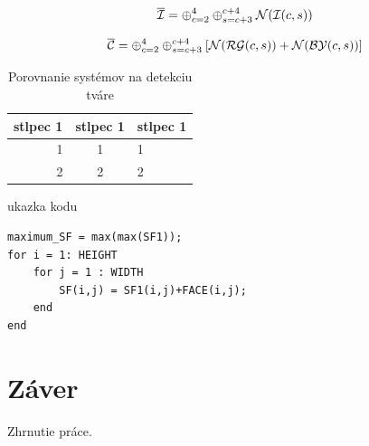\documentclass[12pt,oneside,a4paper]{book}
\begin{document}
\begin{equation}
     \overline{\cal{I}}  = \oplus _{c=2}^{4} \oplus _{s=c+3}^{c+4} \begin{cal}N\end{cal}(\begin{cal}I\end{cal}(c,s))
\end{equation}

\begin{equation}
    \overline{\begin{cal}C\end{cal}}  = \oplus _{c=2}^{4} \oplus _{s=c+3}^{c+4} [\begin{cal}N\end{cal}(\begin{cal}RG\end{cal}(c,s)) + \begin{cal}N\end{cal}(\begin{cal}BY\end{cal}(c,s))]
\end{equation}

\begin{table}[t]
  \centering
   \begin{tabular}{|r|c|l|}
     \hline
     stlpec 1&stlpec 1&stlpec 1\\
     \hline
     1& 1& 1\\
     2& 2& 2\\
     \hline
   \end{tabular}
   \caption{Porovnanie systémov na detekciu tváre}
  \label{tab:table1}
\end{table} 

\newpage
ukazka kodu
\begin{verbatim}
maximum_SF = max(max(SF1));
for i = 1: HEIGHT
    for j = 1 : WIDTH
   		SF(i,j) = SF1(i,j)+FACE(i,j);
    end
end
\end{verbatim}


\chapter{Záver}
Zhrnutie práce.



\end{document}
